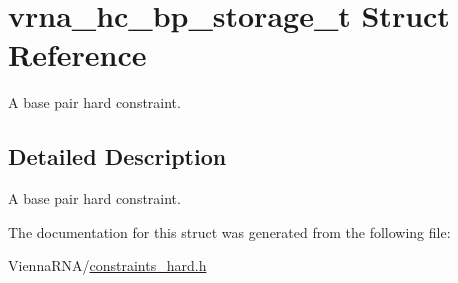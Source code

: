 \hypertarget{structvrna__hc__bp__storage__t}{}\section{vrna\+\_\+hc\+\_\+bp\+\_\+storage\+\_\+t Struct Reference}
\label{structvrna__hc__bp__storage__t}


A base pair hard constraint.  




\subsection{Detailed Description}
A base pair hard constraint. 

The documentation for this struct was generated from the following file\+:\begin{DoxyCompactItemize}
\item 
Vienna\+R\+N\+A/\hyperlink{constraints__hard_8h}{constraints\+\_\+hard.\+h}\end{DoxyCompactItemize}
